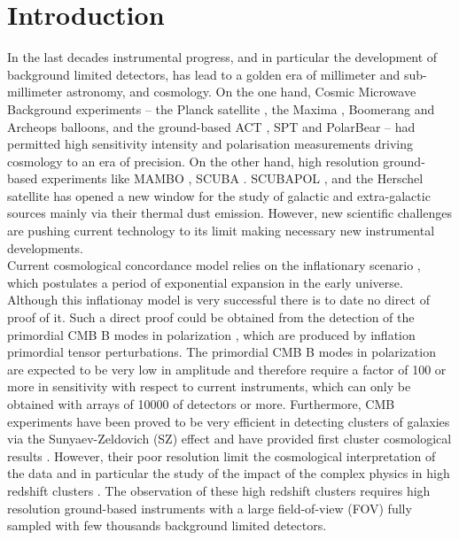\documentclass[]{aa} %
\begin{document}

   \maketitle
%

\section{Introduction}

In the last decades instrumental progress, and in particular the development of background limited detectors, has lead to a golden era of millimeter and sub-millimeter astronomy, and cosmology. On the one hand, Cosmic Microwave Background experiments -- the Planck satellite \cite{}, the Maxima \cite{}, Boomerang\cite{} and Archeops \cite{} balloons, and the ground-based ACT \cite{}, SPT \cite{} and PolarBear \cite{} -- had permitted high sensitivity intensity and polarisation measurements driving cosmology to an era of precision. On the other hand, high resolution ground-based experiments like MAMBO \cite{}, SCUBA \cite{}. SCUBAPOL \cite{}, and the Herschel satellite \cite{} has opened a new window for the study of galactic and extra-galactic sources mainly via their thermal dust emission. However, new scientific challenges are pushing current technology to its limit making necessary new instrumental developments. \\

Current cosmological concordance model \cite{} relies on the inflationary scenario \cite{}, which postulates a period of exponential expansion in the early universe. Although this inflationay model is very successful \cite{} there is to date no direct of proof of it. Such a direct proof could be obtained from the detection of the primordial CMB B modes in polarization \cite{}, which are produced by inflation primordial tensor perturbations. The primordial CMB B modes in polarization are expected to be very low in amplitude and therefore require a factor of 100 or more in sensitivity with respect to current instruments, which can only be obtained with arrays of 10000 of detectors or more. Furthermore, CMB experiments have been proved to be very efficient in detecting clusters of galaxies via the Sunyaev-Zeldovich (SZ) effect \cite{plancksz,actsz,sptsz} and have provided first cluster cosmological results \cite{planckpapers}. However, their poor resolution limit the cosmological interpretation of the data and in particular the study of the impact  of the complex physics in high redshift clusters \cite{planckcosmo}. The observation of these high redshift clusters requires high resolution ground-based instruments with a large field-of-view (FOV) fully sampled with few thousands background limited detectors. \\
\end{document}
